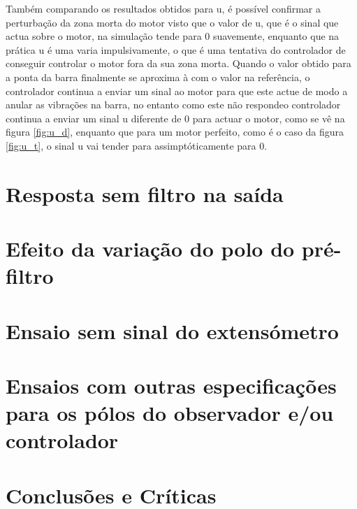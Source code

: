 \documentclass[%
  reprint,
  nofootinbib,
  amsmath,amssymb,
  aps,
  10pt,
  a4paper
]{revtex4-1}
\begin{document}
Também comparando os resultados obtidos para u, é possível confirmar a perturbação da zona morta do motor visto que o valor de u, que é o sinal que actua sobre o motor,  na simulação tende para 0 suavemente, enquanto que na prática u é uma varia impulsivamente, o que é uma tentativa do controlador de conseguir controlar o motor fora da sua zona morta. Quando o valor obtido para a ponta da barra finalmente se aproxima à com o valor na referência, o controlador continua a enviar um sinal ao motor para que este actue de modo a anular as vibrações na barra, no entanto como este não respondeo controlador continua a enviar um  sinal u diferente de 0 para actuar o motor, como se vê na figura \ref{fig:u_d}, enquanto que para um motor perfeito, como é o caso da figura \ref{fig:u_t}, o sinal u vai tender para assimptóticamente para 0.
\section{Resposta sem filtro na saída}

\section{Efeito da variação do polo do pré-filtro}

\section{Ensaio sem sinal do extensómetro}

\section{Ensaios com outras especificações para os pólos do observador e/ou controlador}

\section{Conclusões e Críticas}
\label{s:conclu}



\nocite{}
{}
\end{document}
